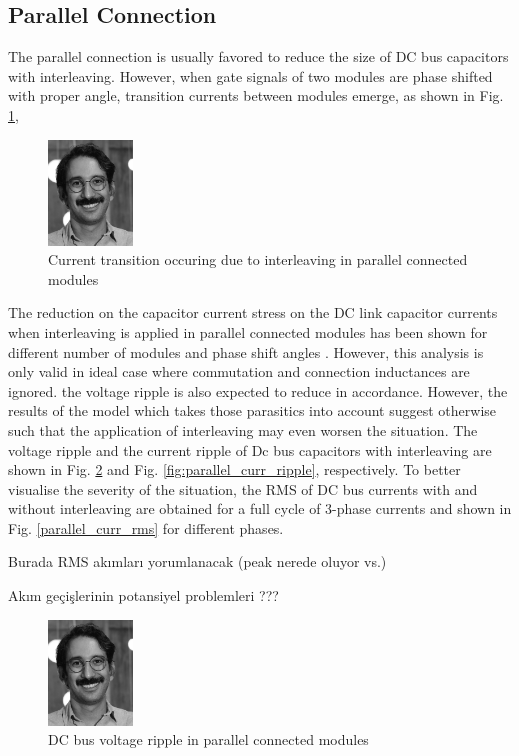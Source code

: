 \subsection{Parallel Connection}
The parallel connection is usually favored to reduce the size of DC bus capacitors with interleaving. However, when gate signals of two modules are phase shifted with proper angle, transition currents between modules emerge, as shown in Fig. \ref{fig:parallel_current_trans},

\begin{figure}[h]
    \centering
    \includegraphics[width=0.2\textwidth]{figures/parallel_current_trans.jpg}
    \caption{Current transition occuring due to interleaving in parallel connected modules}
    \label{fig:parallel_current_trans}
\end{figure}

The reduction on the capacitor current stress on the DC link capacitor currents when interleaving is applied in parallel connected modules has been shown for different number of modules and phase shift angles \cite{Ugur2017}. However, this analysis is only valid in ideal case where commutation and connection inductances are ignored. the voltage ripple is also expected to reduce in accordance. However, the results of the model which takes those parasitics into account suggest otherwise such that the application of interleaving may even worsen the situation. The voltage ripple and the current ripple of Dc bus capacitors with interleaving are shown in Fig. \ref{fig:parallel_volt_ripple} and Fig. \ref{fig:parallel_curr_ripple}, respectively. To better visualise the severity of the situation, the RMS of DC bus currents with and without interleaving are obtained for a full cycle of 3-phase currents and shown in Fig. \ref{parallel_curr_rms} for different phases.

Burada RMS akımları yorumlanacak (peak nerede oluyor vs.)

Akım geçişlerinin potansiyel problemleri ???

\begin{figure}[h]
    \centering
    \includegraphics[width=0.2\textwidth]{figures/parallel_volt_ripple.jpg}
    \caption{DC bus voltage ripple in parallel connected modules}
    \label{fig:parallel_volt_ripple}
\end{figure}

